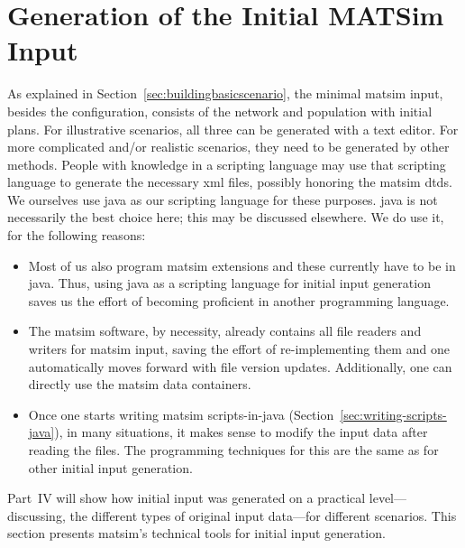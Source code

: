 \chapter{Generation of the Initial MATSim Input}
\label{sec:extending:initial-input}

As explained in Section~\ref{sec:buildingbasicscenario}, the minimal \gls{matsim} input, besides the configuration, consists of the network and population with initial plans.  For illustrative scenarios, all three can be generated with a text editor.  For more complicated and/or realistic scenarios, they need to be generated by other methods.  People with knowledge in a scripting language may use that scripting language to generate the necessary \gls{xml} files, possibly honoring the \gls{matsim} \glspl{dtd}.  We ourselves use \gls{java} as our scripting language for these purposes.  \gls{java} is not necessarily the best choice here; this may be discussed elsewhere.  We do use it, for the following reasons:
\begin{itemize}

\item Most of us also program \gls{matsim} extensions and these currently have to be in \gls{java}.  Thus, using \gls{java} as a scripting language for initial input generation saves us the effort of becoming proficient in another programming language.

\item The \gls{matsim} software, by necessity, already contains all file readers and writers for \gls{matsim} input, saving the effort of re-implementing them and one automatically moves forward with file version updates.  Additionally, one can directly use the \gls{matsim} data containers.

\item Once one starts writing \gls{matsim} scripts-in-\gls{java} (Section~\ref{sec:writing-scripts-java}), in many situations, it makes sense to modify the input data after reading the files.  The programming techniques for this are the same as for other initial input generation.

\end{itemize}
Part~IV will show how initial input was generated on a practical level---discussing, \eg the different types of original input data---for different scenarios.  This section  presents \gls{matsim}'s technical tools for initial input generation.
%
%

